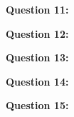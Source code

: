 \documentclass{report}
\begin{document}
    \bigbreak \noindent \bigbreak \noindent 
    \begin{Large}
        \noindent \textbf{Question 11:}
    \end{Large}
    \bigbreak \noindent 
    \bigbreak \noindent 

    \bigbreak \noindent \bigbreak \noindent 
    \begin{Large}
        \noindent \textbf{Question 12:}
    \end{Large}
    \bigbreak \noindent 
    \bigbreak \noindent 

    \bigbreak \noindent \bigbreak \noindent 
    \begin{Large}
        \noindent \textbf{Question 13:}
    \end{Large}
    \bigbreak \noindent 
    \bigbreak \noindent 

    \bigbreak \noindent \bigbreak \noindent 
    \begin{Large}
        \noindent \textbf{Question 14:}
    \end{Large}
    \bigbreak \noindent 
    \bigbreak \noindent 

    \bigbreak \noindent \bigbreak \noindent 
    \begin{Large}
        \noindent \textbf{Question 15:}
    \end{Large}
    \bigbreak \noindent 
    \bigbreak \noindent 
\end{document}

